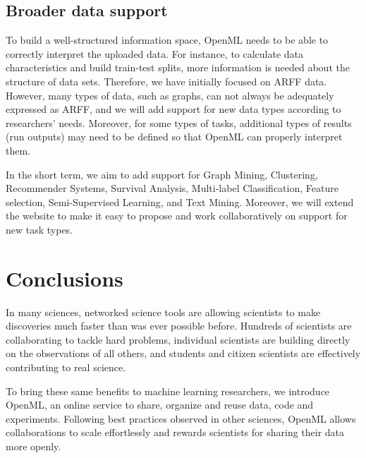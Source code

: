 \documentclass{acmproc-sp}
\begin{document}
\subsection{Broader data support} 
To build a well-structured information space, OpenML needs to be able to correctly interpret the uploaded data. For instance, to calculate data characteristics and build train-test splits, more information is needed about the structure of data sets. Therefore, we have initially focused on ARFF data. However, many types of data, such as graphs, can not always be adequately expressed as ARFF, and we will add support for new data types according to researchers' needs. Moreover, for some types of tasks, additional types of results (run outputs) may need to be defined so that OpenML can properly interpret them. 

In the short term, we aim to add support for Graph Mining, Clustering, Recommender Systems, Survival Analysis, Multi-label Classification, Feature selection, Semi-Supervised Learning, and Text Mining. Moreover, we will extend the website to make it easy to propose and work collaboratively on support for new task types. 



\section{Conclusions}
\label{conclusions} 
In many sciences, networked science tools are allowing scientists to make discoveries much faster than was ever possible before. Hundreds of scientists are collaborating to tackle hard problems, individual scientists are building directly on the observations of all others, and students and citizen scientists are effectively contributing to real science.

To bring these same benefits to machine learning researchers, we introduce OpenML, an online service to share, organize and reuse data, code and experiments. Following best practices observed in other sciences, OpenML allows collaborations to scale effortlessly and rewards scientists for sharing their data more openly. 
\end{document}
